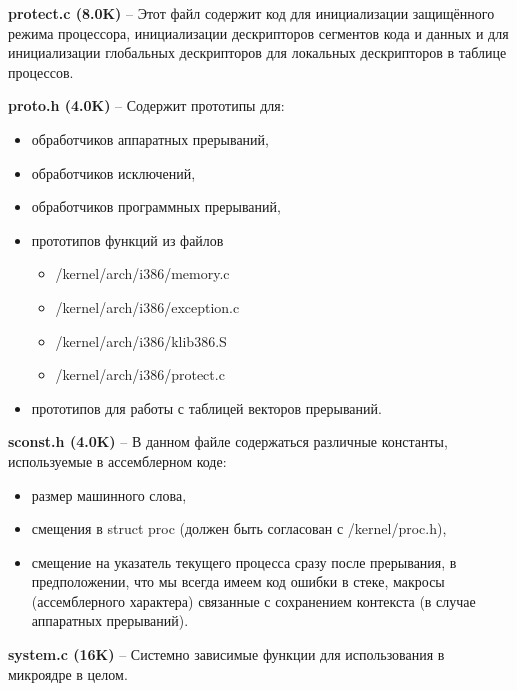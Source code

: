 \textbf{protect.c (8.0K)} -- Этот файл содержит код для инициализации защищённого режима процессора, инициализации дескрипторов сегментов кода и данных и для инициализации глобальных дескрипторов для локальных дескрипторов в таблице процессов.

\textbf{proto.h (4.0K)} -- Содержит прототипы для:
\begin{itemize}
\item обработчиков аппаратных прерываний,
\item обработчиков исключений,
\item обработчиков программных прерываний,
\item прототипов функций из файлов
\begin{itemize}
\item /kernel/arch/i386/memory.c
\item /kernel/arch/i386/exception.c
\item /kernel/arch/i386/klib386.S
\item /kernel/arch/i386/protect.c
\end{itemize}
\item прототипов для работы с таблицей векторов прерываний.
\end{itemize}

\textbf{sconst.h (4.0K)} -- В данном файле содержаться различные константы, используемые в ассемблерном коде:
\begin{itemize}
\item размер машинного слова,
\item смещения в struct proc (должен быть согласован с /kernel/proc.h),
\item смещение на указатель текущего процесса сразу после прерывания, в предположении, что мы всегда имеем код ошибки в стеке, макросы (ассемблерного характера) связанные с сохранением контекста (в случае аппаратных прерываний).
\end{itemize}

\textbf{system.c (16K)} -- Системно зависимые функции для использования в микроядре в целом.